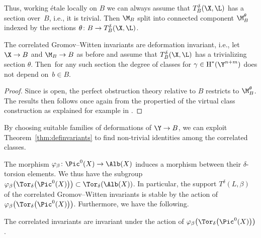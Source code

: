 Thus, working \'etale locally on $B$ we can always assume that
$T^\delta_B(\X,\L)$ has a section over~$B$, i.e., it is trivial. Then $\M_B$ split into connected component $\M_B^\theta$ indexed by the sections $\theta\colon B \to T^\delta_B(\X,\L)$.

\begin{theo}\label{thm:definvariants}
The correlated Gromov--Witten invariants are deformation invariant, i.e., let~${\X\to B}$ and $\M_B\to B$ as before and assume that $T^\delta_B(\X,\L)$ has a trivializing section $\theta$. Then~for any such section the degree of classes  for $\gamma\in\text{H}^*(\Y^{n+m})$ does not depend on~${b\in B}$.
\end{theo}

\begin{proof}
 Since  is open, the perfect obstruction theory  relative to $B$ restricts to $\M_B^\theta$. The results then follows once again from the propertied of the virtual class construction \cite{behrend1997intrinsic,manolache2012virtual} as explained for example in \cite[Appendix~A]{mandel2020descendant}.
\end{proof}

By choosing suitable families of deformations of $\Y\to B$, we can exploit Theorem~\ref{thm:definvariants} to find non-trivial identities among the correlated classes.

The morphism $\varphi_\beta\colon\Pic^0(X)\to\Alb(X)$ induces a morphism between their $\delta$-torsion elements. We thus have the subgroup $\varphi_\beta\bigl(\Tor_\delta\bigl(\Pic^0(X)\bigr)\bigr)\subset\Tor_\delta(\Alb(X))$. In particular, the support $T^\delta(L,\beta)$ of the correlated Gromov--Witten invariants is stable by the action of $\varphi_\beta\bigl(\Tor_\delta\bigl(\Pic^0(X)\bigr)\bigr)$. Furthermore, we have the following.

\begin{theo}\label{theo-torsor-invariance}
 The correlated invariants  are invariant under the action of $\varphi_\beta\bigl(\Tor_\delta\bigl(\Pic^0(X)\bigr)\bigr)$.
\end{theo}

